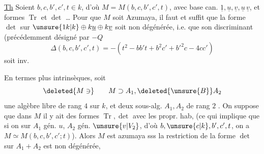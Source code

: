 \uline{Th} Soient $b,c,b',c',t\in k$, d'où $M=M(b,c,b',c',t)$, avec base can. $\underline{1},\underline{u},\underline{v},\underline{u}\,\underline{v}$, et formes $\operatorname{Tr}$ et $\det$ \ldots{} Pour que $M$ soit Azumaya, il faut et suffit que la forme $\det$ sur $\unsure{1k|k}\oplus k\underline{u}\oplus k\underline{v}$ soit non dégénérée, i.e. que son discriminant   (précédemment désigné par $-Q$
\[
\Delta(b,c,b',c',t)=-(t^2-bb't+b^2c'+b'^2c-4cc')
\]
soit inv.

En termes plus intrinsèques, soit
\[
\deleted{M\ni}\qquad M\supset A_1,\deleted{\unsure{B}} A_2
\]
une algèbre  libre de rang $4$ sur $k$,  et deux sous-alg. $A_1,A_2$  de rang $2$ . On suppose que  dans $M$ il y ait des formes $\operatorname{Tr},\det$ avec les propr. hab,  (ce qui implique que si on  sur $A_1$ gén. $u$, $A_2$ gén. $\unsure{v|V_2}$, d'où $b,\unsure{c|k},b',c',t$, on a $M\simeq M(b,c,b',c';t)$). Alors $M$ est azumaya sss la restriction de la forme  $\det$ sur $A_1+A_2$ est non dégénérée,
